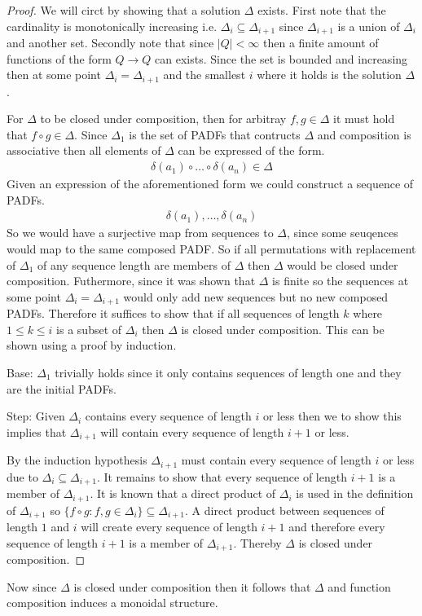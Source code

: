 \documentclass[a4paper,12pt]{article}
\theoremstyle{definition}
\begin{document}
\begin{proof}
  We will circt by showing that a solution $\Delta$ exists. First note that the cardinality is monotonically increasing i.e. $\Delta_i \subseteq \Delta_{i + 1}$ since $\Delta_{i + 1}$ is a union of $\Delta_i$ and another set. Secondly note that since $|Q| < \infty$ then a finite amount of functions of the form $Q \to Q$ can exists. Since the set is bounded and increasing then at some point $\Delta_i = \Delta_{i + 1}$ and the smallest $i$ where it holds is the solution $\Delta$.

  For $\Delta$ to be closed under composition, then for arbitray $f, g \in \Delta$ it must hold that $f \circ g \in \Delta$. Since $\Delta_1$ is the set of PADFs that contructs $\Delta$ and composition is associative then all elements of $\Delta$ can be expressed of the form.
  \begin{align*}
    \delta(a_1) \circ \dots \circ \delta(a_n) \in \Delta
  \end{align*}
  Given an expression of the aforementioned form we could construct a sequence of PADFs.
  \begin{align*}
    \delta(a_1), \dots, \delta(a_n)
  \end{align*}
  So we would have a surjective map from sequences to $\Delta$, since some seuqences would map to the same composed PADF. So if all permutations with replacement of $\Delta_1$ of any sequence length are members of $\Delta$ then $\Delta$ would be closed under composition. Futhermore, since it was shown that $\Delta$ is finite so the sequences at some point $\Delta_i = \Delta_{i + 1}$ would only add new sequences but no new composed PADFs. Therefore it suffices to show that if all sequences of length $k$ where $1 \leq k \leq i$ is a subset of $\Delta_i$ then $\Delta$ is closed under composition. This can be shown using a proof by induction.

  Base: $\Delta_1$ trivially holds since it only contains sequences of length one and they are the initial PADFs.

  Step: Given $\Delta_i$ contains every sequence of length $i$ or less then we to show this implies that $\Delta_{i + 1}$ will contain every sequence of length $i + 1$ or less.

  By the induction hypothesis $\Delta_{i + 1}$ must contain every sequence of length $i$ or less due to $\Delta_i \subseteq \Delta_{i + 1}$. It remains to show that every sequence of length $i + 1$ is a member of $\Delta_{i + 1}$. It is known that a direct product of $\Delta_i$ is used in the definition of $\Delta_{i + 1}$ so $\{f \circ g : f, g \in \Delta_i\} \subseteq \Delta_{i + 1}$. A direct product between sequences of length $1$ and $i$ will create every sequence of length $i + 1$ and therefore every sequence of length $i + 1$ is a member of $\Delta_{i + 1}$. Thereby $\Delta$ is closed under composition.
\end{proof}
\noindent Now since $\Delta$ is closed under composition then it follows that $\Delta$ and function composition induces a monoidal structure.
\end{document}
